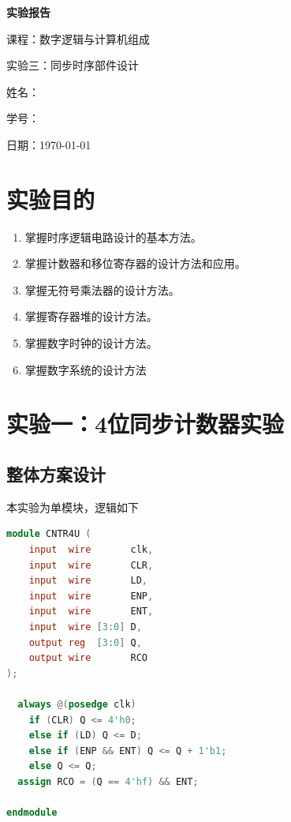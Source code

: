 \documentclass[12pt, a4paper]{ctexart}
\begin{document}
\begin{titlepage}
    \centering
    \vspace*{5cm}
    {\Huge\bfseries 实验报告\par}
    \vspace{2cm}
    {\Large 课程：数字逻辑与计算机组成\par}
    \vspace{1cm}
    {\Large 实验三：同步时序部件设计\par}
    \vspace{4cm}
    {\large 姓名：\underline{}\par}
    \vspace{1cm}
    {\large 学号：\underline{}\par}
    \vspace{1cm}
    {\large 日期：\today\par}
\end{titlepage}

\tableofcontents
\enlargethispage{\baselineskip}
\newpage

\section{实验目的}

\begin{enumerate}
    \item 掌握时序逻辑电路设计的基本方法。
    \item 掌握计数器和移位寄存器的设计方法和应用。
    \item 掌握无符号乘法器的设计方法。
    \item 掌握寄存器堆的设计方法。
    \item 掌握数字时钟的设计方法。
    \item 掌握数字系统的设计方法
\end{enumerate}

\section{实验一：4位同步计数器实验}

\subsection{整体方案设计}

本实验为单模块，逻辑如下

\begin{lstlisting}[language=Verilog, caption={4位同步计数器模块}]
module CNTR4U (
    input  wire       clk,
    input  wire       CLR,
    input  wire       LD,
    input  wire       ENP,
    input  wire       ENT,
    input  wire [3:0] D,
    output reg  [3:0] Q,
    output wire       RCO
);

  always @(posedge clk)
    if (CLR) Q <= 4'h0;
    else if (LD) Q <= D;
    else if (ENP && ENT) Q <= Q + 1'b1;
    else Q <= Q;
  assign RCO = (Q == 4'hf) && ENT;

endmodule
\end{lstlisting}
\end{document}
